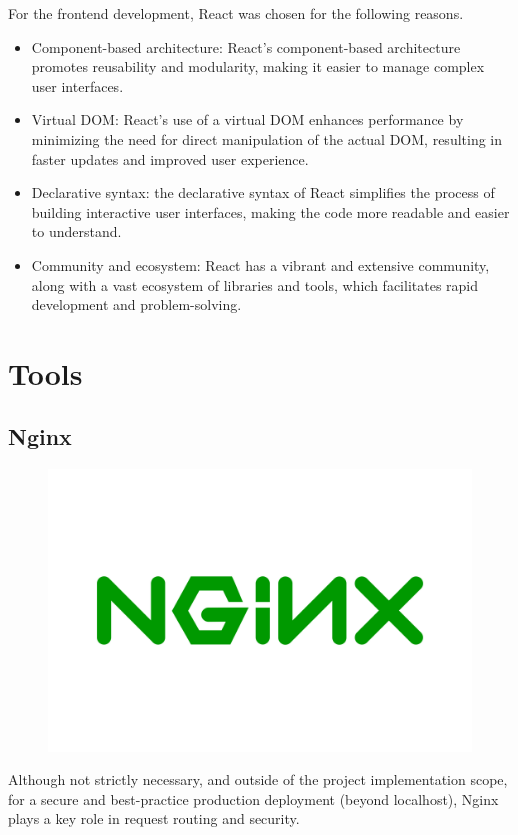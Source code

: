 For the frontend development, React was chosen for the following reasons.

\begin{itemize}

    \item Component-based architecture: React’s component-based architecture promotes reusability and modularity, making it easier to manage complex user interfaces.
    \item Virtual DOM: React’s use of a virtual DOM enhances performance by minimizing the need for direct manipulation of the actual DOM, resulting in faster updates and improved user experience.
    \item Declarative syntax: the declarative syntax of React simplifies the process of building interactive user interfaces, making the code more readable and easier to understand.
    \item Community and ecosystem: React has a vibrant and extensive community, along with a vast ecosystem of libraries and tools, which facilitates rapid development and problem-solving.

\end{itemize}

\section{Tools}

\subsection{Nginx}

\begin{figure}[H]
    \hfill
    \includegraphics[width=0.1\linewidth]{../assets/tools-logos/nginx.png}
    \hspace{1cm}
\end{figure}

Although not strictly necessary, and outside of the project implementation scope, for a secure and best-practice production deployment (beyond localhost), Nginx plays a key role in request routing and security.

